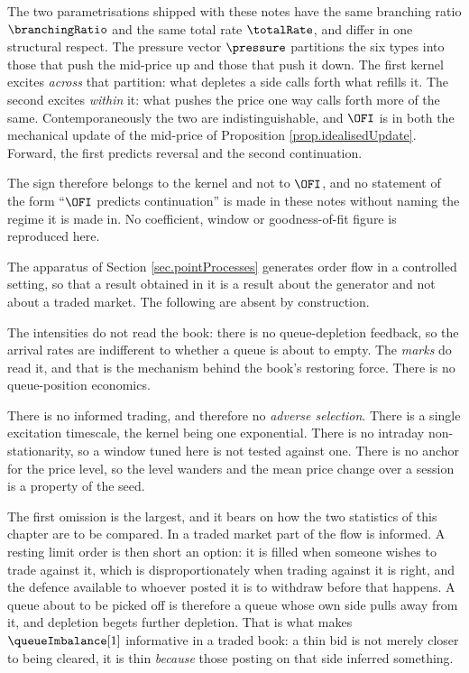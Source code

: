 The two parametrisations shipped with these notes have the same branching ratio
$\branchingRatio$ and the same total rate $\totalRate$,
and differ in one structural respect.
The pressure vector $\pressure$ partitions the six types into those that push the mid-price
up and those that push it down.
The first kernel excites \emph{across} that partition:
what depletes a side calls forth what refills it.
The second excites \emph{within} it:
what pushes the price one way calls forth more of the same.
Contemporaneously the two are indistinguishable,
and $\OFI$ is in both the mechanical update of the mid-price of
Proposition \ref{prop.idealisedUpdate}.
Forward, the first predicts reversal and the second continuation.

The sign therefore belongs to the kernel and not to $\OFI$,
and no statement of the form ``$\OFI$ predicts continuation'' is made in these notes
without naming the regime it is made in.
No coefficient, window or goodness-of-fit figure is reproduced here.

The apparatus of Section \ref{sec.pointProcesses} generates order flow in a controlled setting,
so that a result obtained in it is a result about the generator and not about a traded market.
The following are absent by construction.

The intensities do not read the book: there is no queue-depletion feedback,
so the arrival rates are indifferent to whether a queue is about to empty.
The \emph{marks} do read it, and that is the mechanism behind the book's restoring force.
There is no queue-position economics.

There is no informed trading, and therefore no \emph{adverse selection}.
There is a single excitation timescale, the kernel being one exponential.
There is no intraday non-stationarity, so a window tuned here is not tested against one.
There is no anchor for the price level, so the level wanders and the mean price change over
a session is a property of the seed.

The first omission is the largest, and it bears on how the two statistics of this chapter
are to be compared.
In a traded market part of the flow is informed.
A resting limit order is then short an option: it is filled when someone wishes to trade
against it, which is disproportionately when trading against it is right,
and the defence available to whoever posted it is to withdraw before that happens.
A queue about to be picked off is therefore a queue whose own side pulls away from it,
and depletion begets further depletion.
That is what makes $\queueImbalance[1]$ informative in a traded book:
a thin bid is not merely closer to being cleared,
it is thin \emph{because} those posting on that side inferred something.

